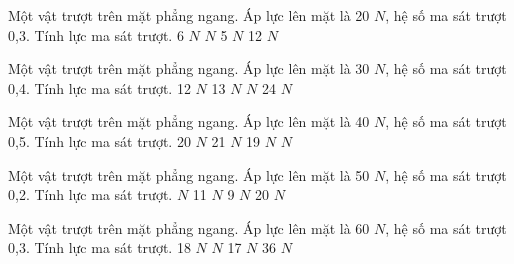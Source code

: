 \begin{ex}
Một vật trượt trên mặt phẳng ngang. Áp lực lên mặt là 20 $N$, hệ số ma sát trượt 0,3. Tính lực ma sát trượt.
\choice
{6 $N$}
{ $N$}
{5 $N$}
{12 $N$}
\end{ex}

\begin{ex}
Một vật trượt trên mặt phẳng ngang. Áp lực lên mặt là 30 $N$, hệ số ma sát trượt 0,4. Tính lực ma sát trượt.
\choice
{12 $N$}
{13 $N$}
{ $N$}
{24 $N$}
\end{ex}

\begin{ex}
Một vật trượt trên mặt phẳng ngang. Áp lực lên mặt là 40 $N$, hệ số ma sát trượt 0,5. Tính lực ma sát trượt.
\choice
{20 $N$}
{21 $N$}
{19 $N$}
{ $N$}
\end{ex}

\begin{ex}
Một vật trượt trên mặt phẳng ngang. Áp lực lên mặt là 50 $N$, hệ số ma sát trượt 0,2. Tính lực ma sát trượt.
\choice
{ $N$}
{11 $N$}
{9 $N$}
{20 $N$}
\end{ex}

\begin{ex}
Một vật trượt trên mặt phẳng ngang. Áp lực lên mặt là 60 $N$, hệ số ma sát trượt 0,3. Tính lực ma sát trượt.
\choice
{18 $N$}
{ $N$}
{17 $N$}
{36 $N$}
\end{ex}

